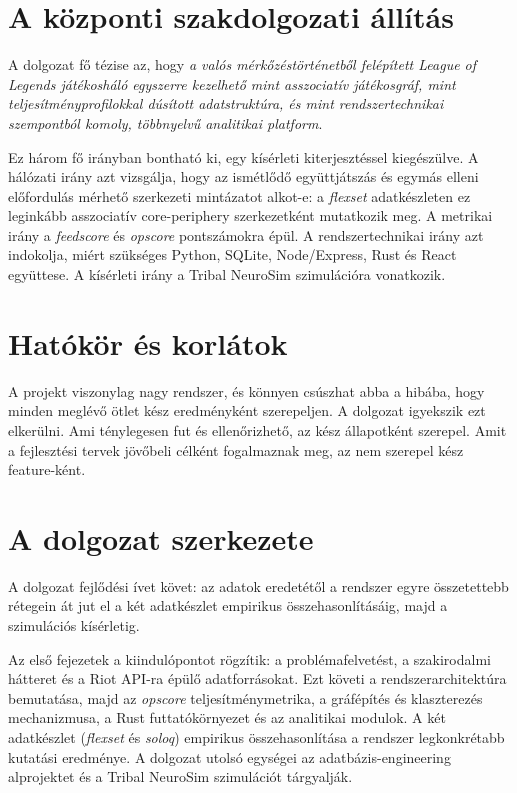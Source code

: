 \section{A központi szakdolgozati állítás}

A dolgozat fő tézise az, hogy \emph{a valós mérkőzéstörténetből felépített League of Legends játékosháló egyszerre kezelhető mint asszociatív játékosgráf, mint teljesítményprofilokkal dúsított adatstruktúra, és mint rendszertechnikai szempontból komoly, többnyelvű analitikai platform}.

Ez három fő irányban bontható ki, egy kísérleti kiterjesztéssel kiegészülve. A hálózati irány azt vizsgálja, hogy az ismétlődő együttjátszás és egymás elleni előfordulás mérhető szerkezeti mintázatot alkot-e: a \textit{flexset} adatkészleten ez leginkább asszociatív core-periphery szerkezetként mutatkozik meg. A metrikai irány a \textit{feedscore} és \textit{opscore} pontszámokra épül. A rendszertechnikai irány azt indokolja, miért szükséges Python, SQLite, Node/Express, Rust és React együttese. A kísérleti irány a Tribal NeuroSim szimulációra vonatkozik.

\section{Hatókör és korlátok}

A projekt viszonylag nagy rendszer, és könnyen csúszhat abba a hibába, hogy minden meglévő ötlet kész eredményként szerepeljen. A dolgozat igyekszik ezt elkerülni. Ami ténylegesen fut és ellenőrizhető, az kész állapotként szerepel. Amit a fejlesztési tervek jövőbeli célként fogalmaznak meg, az nem szerepel kész feature-ként.

\section{A dolgozat szerkezete}

A dolgozat fejlődési ívet követ: az adatok eredetétől a rendszer egyre összetettebb rétegein át jut el a két adatkészlet empirikus összehasonlításáig, majd a szimulációs kísérletig.

Az első fejezetek a kiindulópontot rögzítik: a problémafelvetést, a szakirodalmi hátteret és a Riot API-ra épülő adatforrásokat. Ezt követi a rendszerarchitektúra bemutatása, majd az \textit{opscore} teljesítménymetrika, a gráfépítés és klaszterezés mechanizmusa, a Rust futtatókörnyezet és az analitikai modulok. A két adatkészlet (\textit{flexset} és \textit{soloq}) empirikus összehasonlítása a rendszer legkonkrétabb kutatási eredménye. A dolgozat utolsó egységei az adatbázis-engineering alprojektet és a Tribal NeuroSim szimulációt tárgyalják.
